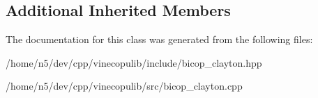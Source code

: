 \subsection*{Additional Inherited Members}


The documentation for this class was generated from the following files\+:\begin{DoxyCompactItemize}
\item 
/home/n5/dev/cpp/vinecopulib/include/bicop\+\_\+clayton.\+hpp\item 
/home/n5/dev/cpp/vinecopulib/src/bicop\+\_\+clayton.\+cpp\end{DoxyCompactItemize}
